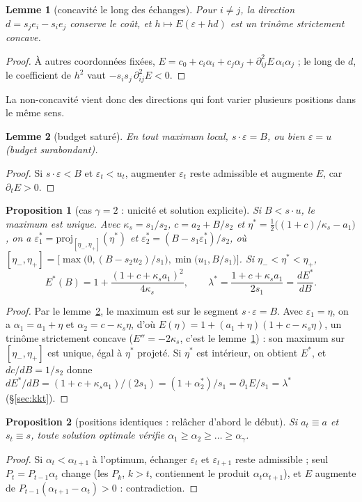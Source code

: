 \documentclass[11pt,a4paper]{article}
\theoremstyle{plain}
\newtheorem{proposition}{Proposition}
\newtheorem{lemme}{Lemme}
\begin{document}
\begin{lemme}[concavité le long des échanges]\label{lem:echange}
Pour $i\ne j$, la direction $d=s_je_i-s_ie_j$ conserve le coût, et $h\mapsto E(\varepsilon+hd)$ est un trinôme strictement concave.
\end{lemme}
\begin{proof}
À autres coordonnées fixées, $E=c_0+c_i\alpha_i+c_j\alpha_j+\partial^2_{ij}E\,\alpha_i\alpha_j$ ; le long de $d$, le coefficient de $h^2$ vaut $-s_is_j\,\partial^2_{ij}E<0$.
\end{proof}
La non-concavité vient donc des directions qui font varier plusieurs positions dans le même sens.

\begin{lemme}[budget saturé]\label{lem:sature}
En tout maximum local, $s\cdot\varepsilon=B$, ou bien $\varepsilon=u$ (budget surabondant).
\end{lemme}
\begin{proof}
Si $s\cdot\varepsilon<B$ et $\varepsilon_t<u_t$, augmenter $\varepsilon_t$ reste admissible et augmente $E$, car $\partial_tE>0$.
\end{proof}

\begin{proposition}[cas $\gamma=2$ : unicité et solution explicite]\label{prop:gamma2}
Si $B<s\cdot u$, le maximum est unique. Avec $\kappa_s=s_1/s_2$, $c=a_2+B/s_2$ et $\eta^*=\tfrac12\big((1+c)/\kappa_s-a_1\big)$, on a $\varepsilon_1^*=\mathrm{proj}_{[\eta_-,\eta_+]}(\eta^*)$ et $\varepsilon_2^*=(B-s_1\varepsilon_1^*)/s_2$, où $[\eta_-,\eta_+]=\big[\max\big(0,(B-s_2u_2)/s_1\big),\min\big(u_1,B/s_1\big)\big]$. Si $\eta_-<\eta^*<\eta_+$,
\[E^*(B)=1+\frac{(1+c+\kappa_sa_1)^2}{4\kappa_s},\qquad \lambda^*=\frac{1+c+\kappa_sa_1}{2s_1}=\frac{dE^*}{dB}.\]
\end{proposition}
\begin{proof}
Par le lemme~\ref{lem:sature}, le maximum est sur le segment $s\cdot\varepsilon=B$. Avec $\varepsilon_1=\eta$, on a $\alpha_1=a_1+\eta$ et $\alpha_2=c-\kappa_s\eta$, d'où $E(\eta)=1+(a_1+\eta)(1+c-\kappa_s\eta)$, un trinôme strictement concave ($E''=-2\kappa_s$, c'est le lemme~\ref{lem:echange}) : son maximum sur $[\eta_-,\eta_+]$ est unique, égal à $\eta^*$ projeté. Si $\eta^*$ est intérieur, on obtient $E^*$, et $dc/dB=1/s_2$ donne $dE^*/dB=(1+c+\kappa_sa_1)/(2s_1)=(1+\alpha^*_2)/s_1=\partial_1E/s_1=\lambda^*$ (§\ref{sec:kkt}).
\end{proof}

\begin{proposition}[positions identiques : relâcher d'abord le début]\label{prop:ordre}
Si $a_t\equiv a$ et $s_t\equiv s$, toute solution optimale vérifie $\alpha_1\ge\alpha_2\ge\dots\ge\alpha_\gamma$.
\end{proposition}
\begin{proof}
Si $\alpha_t<\alpha_{t+1}$ à l'optimum, échanger $\varepsilon_t$ et $\varepsilon_{t+1}$ reste admissible ; seul $P_t=P_{t-1}\alpha_t$ change (les $P_k$, $k>t$, contiennent le produit $\alpha_t\alpha_{t+1}$), et $E$ augmente de $P_{t-1}(\alpha_{t+1}-\alpha_t)>0$ : contradiction.
\end{proof}
\end{document}

